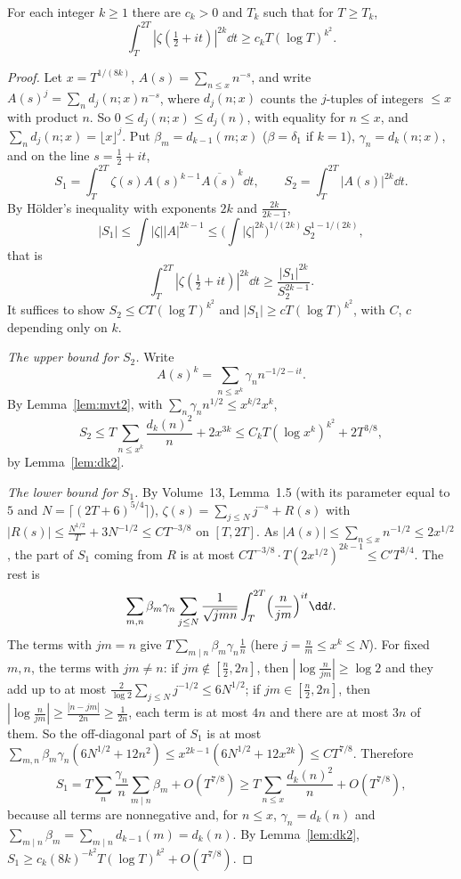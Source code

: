 \begin{theorem}\label{thm:momentlower}
For each integer $k\ge1$ there are $c_k>0$ and $T_k$ such that for $T\ge T_k$,
\[
\int_T^{2T}|\zeta(\tfrac12+it)|^{2k}\dd t\ge c_kT(\log T)^{k^2}.
\]
\end{theorem}
\begin{proof}
Let $x=T^{1/(8k)}$, $A(s)=\sum_{n\le x}n^{-s}$, and write $A(s)^j=\sum_nd_j(n;x)n^{-s}$, where $d_j(n;x)$ counts the $j$-tuples of integers $\le x$ with product $n$. So $0\le d_j(n;x)\le d_j(n)$, with equality for $n\le x$, and $\sum_nd_j(n;x)=\lfloor x\rfloor^j$. Put $\beta_m=d_{k-1}(m;x)$ ($\beta=\delta_1$ if $k=1$), $\gamma_n=d_k(n;x)$, and on the line $s=\frac12+it$,
\[
S_1=\int_T^{2T}\zeta(s)A(s)^{k-1}\overline{A(s)}^k\dd t,\qquad S_2=\int_T^{2T}|A(s)|^{2k}\dd t.
\]
By Hölder's inequality with exponents $2k$ and $\frac{2k}{2k-1}$,
\[
|S_1|\le\int|\zeta||A|^{2k-1}\le\bigl(\int|\zeta|^{2k}\bigr)^{1/(2k)}S_2^{1-1/(2k)},
\]
that is
\[
\int_T^{2T}|\zeta(\tfrac12+it)|^{2k}\dd t\ge\frac{|S_1|^{2k}}{S_2^{2k-1}}.
\]
It suffices to show $S_2\le C T(\log T)^{k^2}$ and $|S_1|\ge cT(\log T)^{k^2}$, with $C$, $c$ depending only on $k$.

\emph{The upper bound for $S_2$.} Write
\[
A(s)^k=\sum_{n\le x^k}\gamma_nn^{-1/2-it}.
\]
By Lemma~\ref{lem:mvt2}, with $\sum_n\gamma_nn^{1/2}\le x^{k/2}x^k$,
\[
S_2\le T\sum_{n\le x^k}\frac{d_k(n)^2}n+2x^{3k}\le C_kT(\log x^k)^{k^2}+2T^{3/8},
\]
by Lemma~\ref{lem:dk2}.

\emph{The lower bound for $S_1$.} By Volume~13, Lemma~1.5 (with its parameter equal to $5$ and $N=\lceil(2T+6)^{5/4}\rceil$), $\zeta(s)=\sum_{j\le N}j^{-s}+R(s)$ with $|R(s)|\le\frac{N^{1/2}}T+3N^{-1/2}\le CT^{-3/8}$ on $[T,2T]$. As $|A(s)|\le\sum_{n\le x}n^{-1/2}\le2x^{1/2}$, the part of $S_1$ coming from $R$ is at most $CT^{-3/8}\cdot T(2x^{1/2})^{2k-1}\le C'T^{3/4}$. The rest is
\[
\sum_{m,n}\beta_m\gamma_n\sum_{j\le N}\frac1{\sqrt{jmn}}\int_T^{2T}\Bigl(\frac n{jm}\Bigr)^{it}\dd t.
\]
The terms with $jm=n$ give $T\sum_{m\mid n}\beta_m\gamma_n\frac1n$ (here $j=\frac nm\le x^k\le N$). For fixed $m,n$, the terms with $jm\ne n$: if $jm\notin[\frac n2,2n]$, then $|\log\frac n{jm}|\ge\log2$ and they add up to at most $\frac2{\log2}\sum_{j\le N}j^{-1/2}\le6N^{1/2}$; if $jm\in[\frac n2,2n]$, then $|\log\frac n{jm}|\ge\frac{|n-jm|}{2n}\ge\frac1{2n}$, each term is at most $4n$ and there are at most $3n$ of them. So the off-diagonal part of $S_1$ is at most $\sum_{m,n}\beta_m\gamma_n(6N^{1/2}+12n^2)\le x^{2k-1}(6N^{1/2}+12x^{2k})\le CT^{7/8}$. Therefore
\[
S_1=T\sum_n\frac{\gamma_n}n\sum_{m\mid n}\beta_m+O(T^{7/8})\ge T\sum_{n\le x}\frac{d_k(n)^2}n+O(T^{7/8}),
\]
because all terms are nonnegative and, for $n\le x$, $\gamma_n=d_k(n)$ and $\sum_{m\mid n}\beta_m=\sum_{m\mid n}d_{k-1}(m)=d_k(n)$. By Lemma~\ref{lem:dk2}, $S_1\ge c_k(8k)^{-k^2}T(\log T)^{k^2}+O(T^{7/8})$.
\end{proof}

